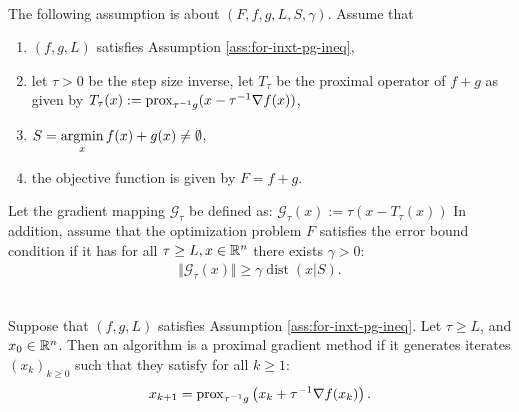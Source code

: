 \documentclass[12pt]{article}
\DeclareMathOperator{\dist}{\mathop{dist}}
\begin{document}
    \begin{assumption}\;\label{ass:pg-eb}\\
        The following assumption is about $(F, f, g, L, S, \gamma)$. 
        Assume that
        \begin{enumerate}[nosep]
            \item $(f, g, L)$ satisfies Assumption \ref{ass:for-inxt-pg-ineq}, 
            \item let $\tau > 0$ be the step size inverse, let $T_{\tau}$ be the proximal operator of $f + g$ as given by $T_{\tau}(x) := \operatorname{prox}_{\tau^{-1}g}(x - \tau^{-1}\nabla f(x))$, 
            \item $S= \mathop{\rm argmin}\limits_{x}{f(x) + g(x)} \neq \emptyset$, 
            \item the objective function is given by $F = f + g$. 
        \end{enumerate}   
        Let the gradient mapping $\mathcal G_{\tau}$ be defined as: $\mathcal G_\tau(x) := \tau (x - T_\tau(x))$     
        In addition, assume that the optimization problem $F$ satisfies the error bound condition if it has for all $\tau \ge L, x \in \mathbb R^n$ there exists $\gamma > 0$: 
        \begin{align}\label{ineq:pg-eb}
            \Vert \mathcal G_\tau(x)\Vert \ge \gamma\dist(x|S). 
        \end{align}
    \end{assumption}
    \begin{definition}\;\label{def:ista}\\
        Suppose that $(f, g, L)$ satisfies Assumption \ref{ass:for-inxt-pg-ineq}. 
        Let $\tau \ge L$, and $x_0 \in \mathbb R^n$. 
        Then an algorithm is a proximal gradient method if it generates iterates $(x_k)_{k \ge 0}$ such that they satisfy for all $k \ge 1$: 
        \begin{align*}
            x_{k + 1} = \operatorname{prox}_{\tau^{-1} g}\left(x_k + \tau^{-1}\nabla f(x_k)\right). 
        \end{align*}
    \end{definition}
\end{document}
